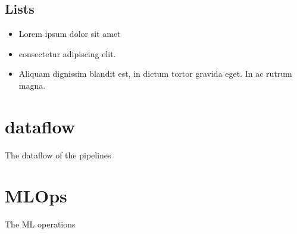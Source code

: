 \documentclass{article}
\begin{document}
\subsection{Lists}
\begin{itemize}
	\item Lorem ipsum dolor sit amet
	\item consectetur adipiscing elit.
	\item Aliquam dignissim blandit est, in dictum tortor gravida eget. In ac rutrum magna.
\end{itemize}

\citet{DBLP:journals/corr/abs-2402-05929}

\cite[see][Page 11]{chen17:_ucb_explor_q_ensem}




\citet{DBLP:journals/cacm/Lamport22}

\citet{kour2014real}

\cite{vidal03:_learn_multiag_system}

\cite{wong21:_deep_multiag_reinf_learn}

\begin{appendices}
	\section{dataflow}
	The dataflow of the pipelines
	\section{MLOps}
	The ML operations
\end{appendices}
%





\end{document}
